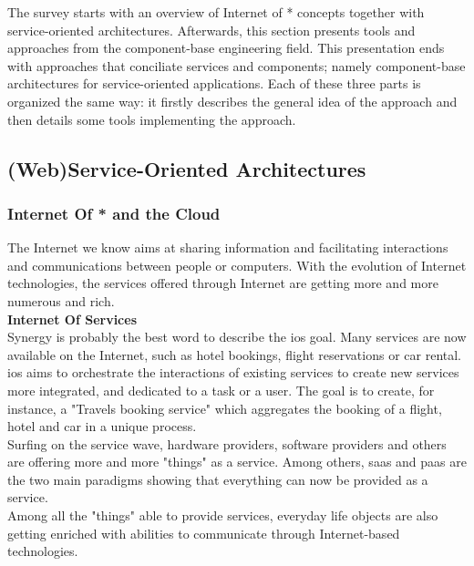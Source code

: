 The survey starts with an overview of Internet of * concepts together with service-oriented architectures. Afterwards, this section presents tools and approaches from the component-base engineering field. This presentation ends with approaches that conciliate services and components; namely component-base architectures for service-oriented applications. Each of these three parts is organized the same way: it firstly describes the general idea of the approach and then details some tools implementing the approach.


\subsection{(Web)Service-Oriented Architectures}
\label{sec:web-services}


\subsubsection{Internet Of * and the Cloud}
\label{subsec:internet_of_stars}

The Internet we know aims at sharing information and facilitating interactions and communications between people or computers. 
With the evolution of Internet technologies, the services offered through Internet are getting more and more numerous and rich.\\

{\bf Internet Of Services}\\
\label{subsec:ios}
Synergy is probably the best word to describe the \gls{ios} goal. Many services are now available on the Internet, such as hotel bookings, flight reservations or car rental. \gls{ios} aims to orchestrate the interactions of existing services to create new services more integrated, and dedicated to a task or a user. The goal is to create, for instance, a "Travels booking service" which aggregates the booking of a flight, hotel and car in a unique process.\\
Surfing on the service wave, hardware providers, software providers and others are offering more and more "things" as a service. Among others, \gls{saas} and \gls{paas} are the two main paradigms showing that everything can now be provided as a service.\\

Among all the "things" able to provide services, everyday life objects are also getting enriched with abilities to communicate through Internet-based technologies.\\

